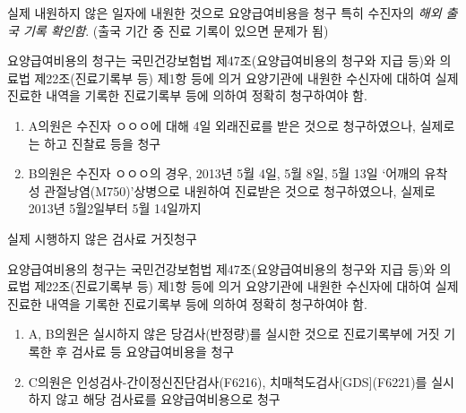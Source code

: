 \begin{commentbox}{실제 내원하지 않은 일자에 내원한 것으로 요양급여비용을 청구}
특히 수진자의 \emph{해외 출국 기록 확인함}. (출국 기간 중 진료 기록이 있으면 문제가 됨)
\begin{description}\tightlist
\item[관련근거] 요양급여비용의 청구는 국민건강보험법 제47조(요양급여비용의 청구와 지급 등)와 의료법 제22조(진료기록부 등) 제1항 등에 의거 요양기관에 내원한 수신자에 대하여 실제 진료한 내역을 기록한 진료기록부 등에 의하여 정확히 청구하여야 함.
\item[부당사례]
\begin{enumerate}[1)]\tightlist
\item A의원은 수진자 ㅇㅇㅇ에 대해 4일 외래진료를 받은 것으로 청구하였으나, 실제로는 하고 진찰료 등을 청구
\item B의원은 수진자 ㅇㅇㅇ의 경우, 2013년 5월 4일, 5월 8일, 5월 13일 ‘어깨의 유착성 관절낭염(M750)’상병으로 내원하여 진료받은 것으로 청구하였으나, 실제로 2013년 5월2일부터 5월 14일까지 
\end{enumerate}
\end{description}
\end{commentbox}

\begin{commentbox}{실제 시행하지 않은 검사료 거짓청구}
\begin{description}\tightlist
\item[관련근거] 요양급여비용의 청구는 국민건강보험법 제47조(요양급여비용의 청구와 지급 등)와 의료법 제22조(진료기록부 등) 제1항 등에 의거 요양기관에 내원한 수신자에 대하여 실제 진료한 내역을 기록한 진료기록부 등에 의하여 정확히 청구하여야 함.
\item[부당사례]
\begin{enumerate}[1)]\tightlist
\item A, B의원은 실시하지 않은 당검사(반정량)를 실시한 것으로 진료기록부에 거짓 기록한 후 검사료 등 요양급여비용을 청구
\item C의원은 인성검사-간이정신진단검사(F6216), 치매척도검사[GDS](F6221)를 실시 하지 않고 해당 검사료를 요양급여비용으로 청구
\end{enumerate}
\end{description}
\end{commentbox}

